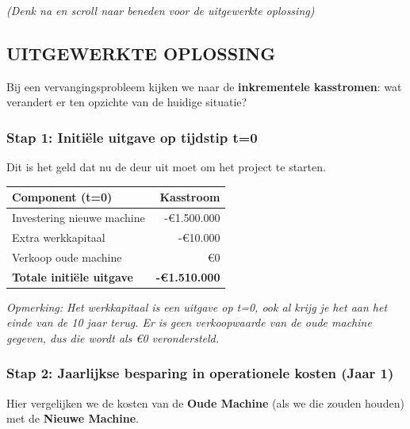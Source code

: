 \documentclass[a4paper,11pt]{article}
\begin{document}
\begin{oefenblok}
    \vspace{0.3cm}
    \textit{(Denk na en scroll naar beneden voor de uitgewerkte oplossing)}




    \subsection*{UITGEWERKTE OPLOSSING}

    Bij een vervangingsprobleem kijken we naar de \textbf{inkrementele kasstromen}: wat verandert er ten opzichte van de huidige situatie?

    \subsubsection*{Stap 1: Initiële uitgave op tijdstip t=0}

    Dit is het geld dat nu de deur uit moet om het project te starten.

    \begin{center}
        \begin{tabular}{|l|r|}
            \hline
            \textbf{Component (t=0)}         & \textbf{Kasstroom}   \\
            \hline
            Investering nieuwe machine       & -€1.500.000          \\
            \hline
            Extra werkkapitaal               & -€10.000             \\
            \hline
            Verkoop oude machine             & €0                   \\
            \hline
            \textbf{Totale initiële uitgave} & \textbf{-€1.510.000} \\
            \hline
        \end{tabular}
    \end{center}

    \textit{Opmerking: Het werkkapitaal is een uitgave op t=0, ook al krijg je het aan het einde van de 10 jaar terug. Er is geen verkoopwaarde van de oude machine gegeven, dus die wordt als €0 verondersteld.}

    \subsubsection*{Stap 2: Jaarlijkse besparing in operationele kosten (Jaar 1)}

    Hier vergelijken we de kosten van de \textbf{Oude Machine} (als we die zouden houden) met de \textbf{Nieuwe Machine}.


\end{oefenblok}
\end{document}
